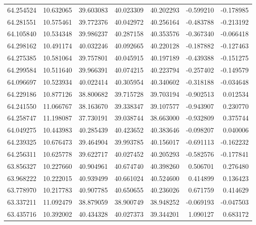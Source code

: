 \begin{tabular}{rrrrrrr}
 64.254524 &  10.632065 &         39.603083 &         40.023309 &         40.202293 & -0.599210 & -0.178985 \\
 64.281551 &  10.575461 &         39.772376 &         40.042972 &         40.256164 & -0.483788 & -0.213192 \\
 64.105840 &  10.534348 &         39.986237 &         40.287158 &         40.353576 & -0.367340 & -0.066418 \\
 64.298162 &  10.491174 &         40.032246 &         40.092665 &         40.220128 & -0.187882 & -0.127463 \\
 64.275385 &  10.581064 &         39.757801 &         40.045915 &         40.197189 & -0.439388 & -0.151275 \\
 64.299584 &  10.511640 &         39.966391 &         40.074215 &         40.223794 & -0.257402 & -0.149579 \\
 64.096697 &  10.523934 &         40.022414 &         40.305954 &         40.340602 & -0.318188 & -0.034648 \\
 64.229186 &  10.877126 &         38.800682 &         39.715728 &         39.703194 & -0.902513 &  0.012534 \\
 64.241550 &  11.066767 &         38.163670 &         39.338347 &         39.107577 & -0.943907 &  0.230770 \\
 64.258747 &  11.198087 &         37.730191 &         39.038744 &         38.663000 & -0.932809 &  0.375744 \\
 64.049275 &  10.443983 &         40.285439 &         40.423652 &         40.383646 & -0.098207 &  0.040006 \\
 64.239325 &  10.676473 &         39.464904 &         39.993785 &         40.156017 & -0.691113 & -0.162232 \\
 64.256311 &  10.625778 &         39.622717 &         40.027452 &         40.205293 & -0.582576 & -0.177841 \\
 63.856327 &  10.227660 &         40.904961 &         40.674740 &         40.398260 &  0.506701 &  0.276480 \\
 63.968222 &  10.222015 &         40.939499 &         40.661024 &         40.524600 &  0.414899 &  0.136423 \\
 63.778970 &  10.217783 &         40.907785 &         40.650655 &         40.236026 &  0.671759 &  0.414629 \\
 63.337211 &  11.092479 &         38.879059 &         38.900749 &         38.948252 & -0.069193 & -0.047503 \\
 63.435716 &  10.392002 &         40.434328 &         40.027373 &         39.344201 &  1.090127 &  0.683172 \\

\end{tabular}
